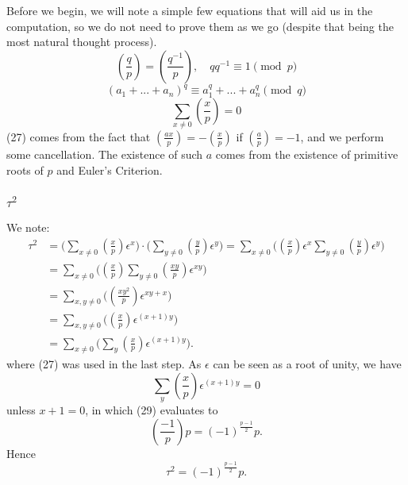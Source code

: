 \documentclass{article}
\newcommand{\legendre}[2]{\genfrac{(}{)}{}{}{#1}{#2}}
\begin{document}
\subsubsection{}
Before we begin, we will note a simple few equations that will aid us in the computation, so we do not need to prove them as we go (despite that being the most natural thought process).
\begin{equation}
    \legendre{q}{p} = \legendre{q^{-1}}{p}, \quad qq^{-1} \equiv 1 \pmod{p}
\end{equation}
\begin{equation}
    (a_{1} + ... + a_{n})^{q} \equiv a_{1}^{q} + ... + a_{n}^{q} \pmod{q}
\end{equation}
\begin{equation}
    \sum_{x \neq 0}\legendre{x}{p} = 0
\end{equation}
(27) comes from the fact that $\legendre{ax}{p} = -\legendre{x}{p}$ if $\legendre{a}{p} = -1$, and we perform some cancellation. The existence of such $a$ comes from the existence of primitive roots of $p$ and Euler's Criterion.

\subsubsection{$\tau^{2}$}
We note:
\begin{equation}
    \begin{split}
        \tau^{2} & = \big(\sum_{x \neq 0}\legendre{x}{p}\epsilon^{x}\big) \cdot \big(\sum_{y \neq 0}\legendre{y}{p}\epsilon^{y}\big)
        = \sum_{x \neq 0}\big(\legendre{x}{p}\epsilon^{x}\sum_{y \neq 0}\legendre{y}{p}\epsilon^{y}\big) \\
        & = \sum_{x \neq 0}\big(\legendre{x}{p}\sum_{y \neq 0}\legendre{xy}{p}\epsilon^{xy}\big) \\
        & = \sum_{x,y \neq 0}\big(\legendre{xy^{2}}{p}\epsilon^{xy+x}\big) \\
        & = \sum_{x,y \neq 0}\big(\legendre{x}{p}\epsilon^{(x+1)y}\big) \\
        & = \sum_{x \neq 0}\big(\sum_{y}\legendre{x}{p}\epsilon^{(x+1)y}\big).
    \end{split}
\end{equation}
where (27) was used in the last step. As $\epsilon$ can be seen as a root of unity, we have
\begin{equation}
    \sum_{y}\legendre{x}{p}\epsilon^{(x+1)y} = 0
\end{equation}
unless $x+1 = 0$, in which (29) evaluates to
\begin{equation}
    \legendre{-1}{p}p = (-1)^{\frac{p-1}{2}}p.
\end{equation}
Hence
\begin{equation}
    \tau^{2} = (-1)^{\frac{p-1}{2}}p.
\end{equation}
\end{document}
